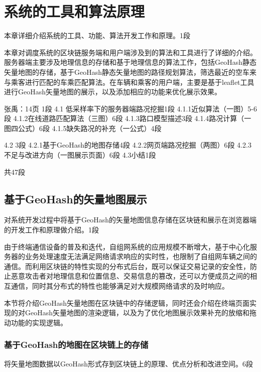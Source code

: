 \chapter{系统的工具和算法原理}
本章详细介绍系统的工具、功能、算法开发工作和原理。1段

本章对调度系统的区块链服务端和用户端涉及到的算法和工具进行了详细的介绍。服务器端主要涉及地理信息的存储和基于地理信息的算法工作，包括GeoHash静态矢量地图的存储，基于GeoHash静态矢量地图的路径规划算法，筛选最近的空车来与乘客进行匹配的车乘匹配算法。在车辆和乘客的用户端，主要是基于leaflet工具进行GeoHash矢量地图的展示，以及添加相应的功能来优化展示效果。

张禹：14页
1段
4.1 低采样率下的服务器端路况挖掘1段
4.1.1近似算法（一图）5-6段
4.1.2在线道路匹配算法（三图）6段
4.1.3路口模型描述3段
4.1.4路况计算（一图四公式）6段
4.1.5缺失路况的补充（一公式）4段

4.2
3段
4.2.1基于GeoHash的地图存储4段
4.2.2网页端路况挖掘（两图）6段
4.2.3不足与改进方向（一图展示页面）6段
4.3小结1段

共47段

\section{基于GeoHash的矢量地图展示}
对系统开发过程中将基于GeoHash的矢量地图信息存储在区块链和展示在浏览器端的开发工作和原理做介绍。1段

由于终端通信设备的普及和迭代，自组网系统的应用规模不断增大，基于中心化服务器的业务处理速度无法满足网络请求响应的实时性，也限制了自组网车辆之间的通信。而利用区块链的特性实现的分布式后台，既可以保证交易记录的安全性，防止恶意攻击者对地理信息和位置信息、交易信息的篡改，还可以方便成员之间的相互通信，同时其分布式的特性也能够满足对大规模网络请求的及时响应。

本节将介绍GeoHash矢量地图在区块链中的存储逻辑，同时还会介绍在终端页面实现的对GeoHash矢量地图的渲染逻辑，以及为了优化地图展示效果补充的放缩和拖动功能的实现逻辑。

\subsection{基于GeoHash的地图在区块链上的存储}
将矢量地图数据以GeoHash形式存到区块链上的原理、优点分析和改进空间。6段

